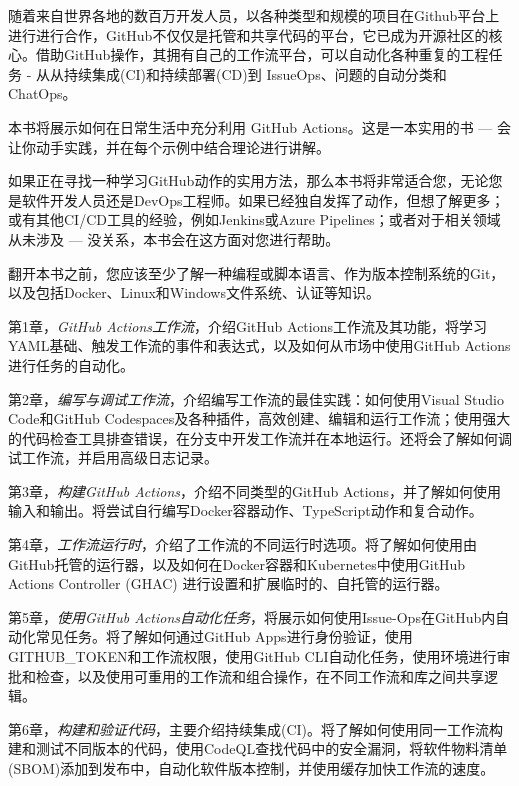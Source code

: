 随着来自世界各地的数百万开发人员，以各种类型和规模的项目在Github平台上进行进行合作，GitHub不仅仅是托管和共享代码的平台，它已成为开源社区的核心。借助GitHub操作，其拥有自己的工作流平台，可以自动化各种重复的工程任务 - 从从持续集成(CI)和持续部署(CD)到 IssueOps、问题的自动分类和 ChatOps。

本书将展示如何在日常生活中充分利用 GitHub Actions。这是一本实用的书 --- 会让你动手实践，并在每个示例中结合理论进行讲解。


如果正在寻找一种学习GitHub动作的实用方法，那么本书将非常适合您，无论您是软件开发人员还是DevOps工程师。如果已经独自发挥了动作，但想了解更多；或有其他CI/CD工具的经验，例如Jenkins或Azure Pipelines；或者对于相关领域从未涉及 --- 没关系，本书会在这方面对您进行帮助。

翻开本书之前，您应该至少了解一种编程或脚本语言、作为版本控制系统的Git，以及包括Docker、Linux和Windows文件系统、认证等知识。


第1章，\textit{GitHub Actions工作流}，介绍GitHub Actions工作流及其功能，将学习YAML基础、触发工作流的事件和表达式，以及如何从市场中使用GitHub Actions进行任务的自动化。

第2章，\textit{编写与调试工作流}，介绍编写工作流的最佳实践：如何使用Visual Studio Code和GitHub Codespaces及各种插件，高效创建、编辑和运行工作流；使用强大的代码检查工具排查错误，在分支中开发工作流并在本地运行。还将会了解如何调试工作流，并启用高级日志记录。

第3章，\textit{构建GitHub Actions}，介绍不同类型的GitHub Actions，并了解如何使用输入和输出。将尝试自行编写Docker容器动作、TypeScript动作和复合动作。

第4章，\textit{工作流运行时}，介绍了工作流的不同运行时选项。将了解如何使用由GitHub托管的运行器，以及如何在Docker容器和Kubernetes中使用GitHub Actions Controller (GHAC) 进行设置和扩展临时的、自托管的运行器。

第5章，\textit{使用GitHub Actions自动化任务}，将展示如何使用Issue-Ops在GitHub内自动化常见任务。将了解如何通过GitHub Apps进行身份验证，使用GITHUB\_TOKEN和工作流权限，使用GitHub CLI自动化任务，使用环境进行审批和检查，以及使用可重用的工作流和组合操作，在不同工作流和库之间共享逻辑。

第6章，\textit{构建和验证代码}，主要介绍持续集成(CI)。将了解如何使用同一工作流构建和测试不同版本的代码，使用CodeQL查找代码中的安全漏洞，将软件物料清单(SBOM)添加到发布中，自动化软件版本控制，并使用缓存加快工作流的速度。

